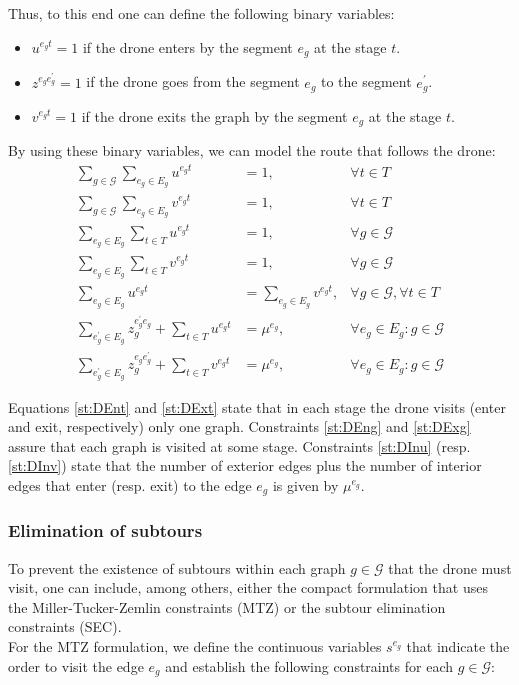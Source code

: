 Thus, to this end one can define the following binary variables:
\begin{itemize}
    \item $u^{e_gt} = 1$ if the drone enters by the segment $e_g$ at the stage $t$.
    \item $z^{e_ge^\prime_g} = 1$ if the drone goes from the segment $e_g$ to the segment $e^\prime_g$.
    \item $v^{e_gt} = 1$ if the drone exits the graph by the segment $e_g$ at the stage $t$.
\end{itemize}

By using these binary variables, we can model the route that follows the drone:
\begin{align}
    \sum_{g\in \mathcal G}\sum_{e_g\in E_g} u^{e_gt} & = 1, &\forall t\in T \label{st:DEnt}\\%
    \sum_{g\in\mathcal G}\sum_{e_g\in E_g} v^{e_gt} & = 1, &\forall t\in T \label{st:DExt}\\%
    \sum_{e_g\in E_g} \sum_{t\in T} u^{e_gt} & = 1, &\forall g\in\mathcal G \label{st:DEng}\\%
    \sum_{e_g\in E_g}\sum_{t\in T} v^{e_gt} & = 1, &\forall g\in\mathcal G \label{st:DExg}\\%
    \sum_{e_g\in E_g} u^{e_gt} & = \sum_{e_g\in E_g} v^{e_gt}, &\forall g\in\mathcal G, \forall t\in T \label{st:Duv}\\%
    \sum_{e^\prime_g\in E_g} z_g^{e^\prime_ge_g} + \sum_{t\in T} u^{e_gt} & = \mu^{e_g}, &\forall e_g\in E_g:g\in\mathcal G \label{st:DInu}\\
    \sum_{e^\prime_g\in E_g} z_g^{e_ge^\prime_g} + \sum_{t\in T} v^{e_gt} & = \mu^{e_g}, &\forall e_g\in E_g:g\in\mathcal G \label{st:DInv}
\end{align}

\noindent
Equations \eqref{st:DEnt} and \eqref{st:DExt} state that in each stage the drone visits (enter and exit, respectively) only one graph. Constraints \eqref{st:DEng} and \eqref{st:DExg} assure that each graph is visited at some stage. Constraints \eqref{st:DInu} (resp. \eqref{st:DInv}) state that the number of exterior edges plus the number of interior edges that enter (resp. exit) to the edge $e_g$ is given by $\mu^{e_g}$.

\subsubsection*{Elimination of subtours}
\noindent
To prevent the existence of subtours within each graph $g\in \mathcal G$ that the drone must visit, one can include, among others, either the compact formulation that uses the Miller-Tucker-Zemlin constraints (MTZ) or the subtour elimination  constraints (SEC).\\
\noindent
For the MTZ formulation, we define the continuous variables $s^{e_g}$ that indicate the order to visit the edge $e_g$ and establish the following constraints for each $g\in\mathcal G$:

